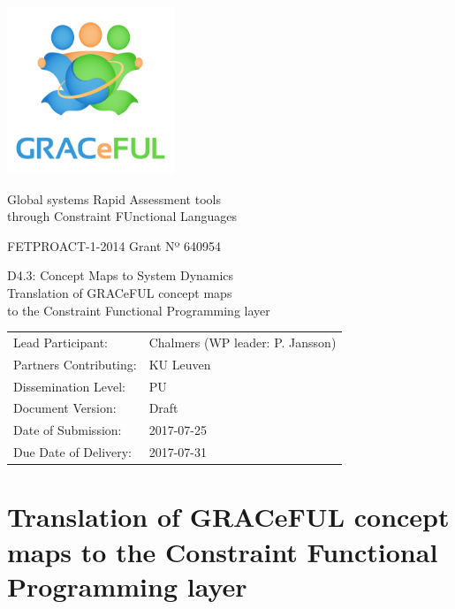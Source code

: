 \documentclass{article}
\author{}
\date{}
\begin{document}
\begin{center}
\includegraphics[width=5cm]{../coverpage/GRACeFULlogo.png}

\textcolor{GRACeFULblue}{Global systems Rapid Assessment tools\\
through Constraint FUnctional Languages}

\vspace{1cm}

FETPROACT-1-2014 Grant Nº 640954

\end{center}

\begin{framed}
\begin{center}
\Large
D4.3: Concept Maps to System Dynamics\\[1ex]

\large
Translation of GRACeFUL concept maps\\
to the Constraint Functional Programming layer\\[1ex]

\end{center}
\end{framed}

\vspace{1cm}

\noindent
\begin{tabular}{@{}ll@{}}
  Lead Participant:       & Chalmers (WP leader: P. Jansson)
\\Partners Contributing:  & KU Leuven
\\Dissemination Level:    & PU
\\Document Version:       & Draft
\\Date of Submission:     & 2017-07-25
\\Due Date of Delivery:   & 2017-07-31
\end{tabular}

\newpage

\section*{Translation of GRACeFUL concept maps to the Constraint Functional Programming layer}\label{DSL4GRACeFUL}
\end{document}
